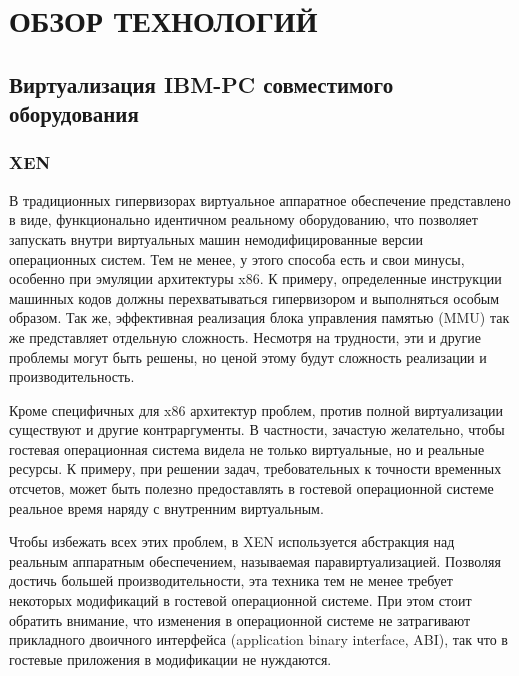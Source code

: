 \chapter{ОБЗОР ТЕХНОЛОГИЙ}

\section{Виртуализация IBM-PC совместимого оборудования}

\subsection{XEN}


В традиционных гипервизорах виртуальное аппаратное обеспечение представлено в 
виде, функционально идентичном реальному оборудованию, что позволяет запускать
внутри виртуальных машин немодифицированные версии операционных систем. Тем не менее,
у этого способа есть и свои минусы, особенно при эмуляции архитектуры x86. К примеру,
определенные инструкции машинных кодов должны перехватываться гипервизором
и выполняться особым образом. Так же, эффективная реализация блока управления памятью
(MMU) так же представляет отдельную сложность. Несмотря на трудности, эти и другие 
проблемы могут быть решены, но ценой этому будут сложность реализации и производительность.

Кроме специфичных для x86 архитектур проблем, против полной виртуализации существуют
и другие контраргументы. В частности, зачастую желательно, чтобы гостевая операционная
система видела не только виртуальные, но и реальные ресурсы. К примеру, при решении
задач, требовательных к точности временных отсчетов, может быть полезно предоставлять
в гостевой операционной системе реальное время наряду с внутренним виртуальным.

Чтобы избежать всех этих проблем, в XEN используется абстракция над реальным аппаратным
обеспечением, называемая паравиртуализацией. Позволяя достичь большей производительности,
эта техника тем не менее требует некоторых модификаций в гостевой операционной системе.
При этом стоит обратить внимание, что изменения в операционной системе не затрагивают
прикладного двоичного интерфейса (application binary interface, ABI), так что в гостевые
приложения в модификации не нуждаются.

